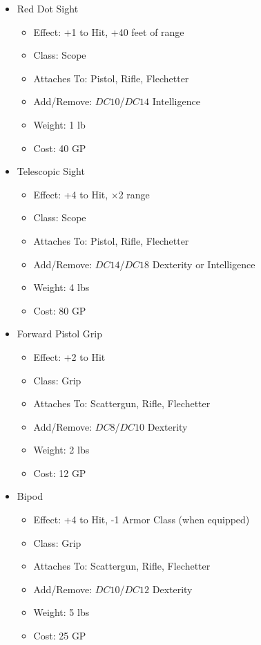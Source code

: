 \documentclass[12pt, landscape]{article}
\begin{document}
\begin{FlushLeft}
\begin{multicols}{2}
			\begin{itemize}
				\item Red Dot Sight
				\begin{itemize}
					\item Effect: +1 to Hit, +40 feet of range
					\item Class: Scope
					\item Attaches To: Pistol, Rifle, Flechetter
					\item Add/Remove: $DC10$/$DC14$ Intelligence
					\item Weight: 1 lb
					\item Cost: 40 GP
				\end{itemize}
				\item Telescopic Sight
				\begin{itemize}
					\item Effect: +4 to Hit, $\times$2 range
					\item Class: Scope
					\item Attaches To: Pistol, Rifle, Flechetter
					\item Add/Remove: $DC14$/$DC18$ Dexterity or Intelligence
					\item Weight: 4 lbs
					\item Cost: 80 GP
				\end{itemize}
				\item Forward Pistol Grip
				\begin{itemize}
					\item Effect: +2 to Hit
					\item Class: Grip
					\item Attaches To: Scattergun, Rifle, Flechetter 
					\item Add/Remove: $DC8$/$DC10$ Dexterity
					\item Weight: 2 lbs
					\item Cost: 12 GP
				\end{itemize}
				\item Bipod
				\begin{itemize}
					\item Effect: +4 to Hit, -1 Armor Class (when equipped)
					\item Class: Grip
					\item Attaches To: Scattergun, Rifle, Flechetter 
					\item Add/Remove: $DC10$/$DC12$ Dexterity
					\item Weight: 5 lbs
					\item Cost: 25 GP
				\end{itemize}
			\end{itemize}


\end{multicols}
\end{FlushLeft}
\end{document}
